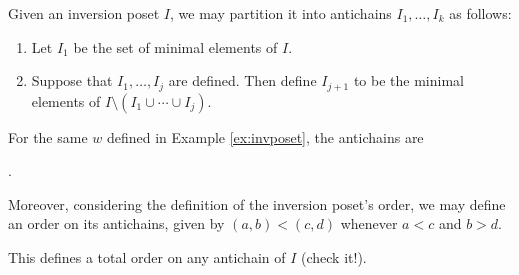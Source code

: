 \documentclass{article}
\begin{document}
Given an inversion poset $I$, we may partition it into antichains $I_1, \ldots, I_k$ as follows:
\begin{enumerate}
    \item Let $I_1$ be the set of minimal elements of $I$.
    \item Suppose that $I_1, \ldots, I_j$ are defined. 
        Then define $I_{j+1}$ to be the minimal elements of $I \setminus (I_1 \cup \cdots \cup I_j)$.
\end{enumerate}

\begin{example}\label{ex:invposetantichains}
    For the same $w$ defined in Example \ref{ex:invposet}, the antichains are
    \begin{center}
        .
    \end{center}
\end{example}

Moreover, considering the definition of the inversion poset's order, we may define an order on its antichains, given by $(a,b) < (c,d)$ whenever $a < c$ and $b > d$.

This defines a total order on any antichain of $I$ (check it!).
\end{document}
